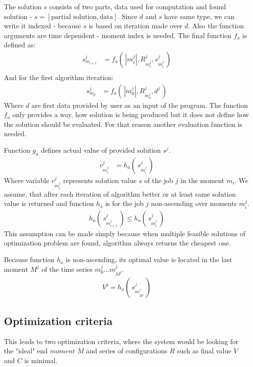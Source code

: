 The solution $s$ consists of two parts, data used for computation and found solution - $s = [\text{partial solution}, \text{data}]$.
Since $d$ and $s$ have same type, we can write it indexed - because $s$ is based on iteration made over $d$.
Also the function arguments are time dependent - moment index is needed.
The final function $f_{a}$ is defined as:
\begin{align*}
	s_{m_{i+1}}^{j} & = f_{a}(\, |m_{i}^{j}|, R_{m_{i}^{j}}^{j}, s_{m_{i}^{j}}^{j}\,) \\
\end{align*}
And for the first algorithm iteration:
\begin{align*}
	s_{m_{0}}^{j} & = f_{a}(\, |m_{0}^{j}|, R_{m_{0}^{j}}^{j}, d^{j}\,) 
\end{align*}
Where $d$ are first data provided by user as an input of the program.
The function $f_{a}$ only provides a way,
how solution is being produced but it does not define how the solution should be evaluated.
For that reason another evaluation function is needed.

\bigskip

\noindent Function $g_{a}$ defines actual value of provided solution $s^{j}$.
\begin{align*}
	v_{m_{i}^{j}}^{j} & = h_{a}(\, s_{m_{i}^{j}}^{j} \,) 
\end{align*}
Where variable $v_{m_{i}^{j}}^{j}$ represents solution value $s$ of the job $j$ in the moment $m_{i}$.
We assume, that after each iteration of algorithm better or at least same solution value is returned
and function $h_{a}$ is for the job $j$ non-ascending over moments $m_{i}^{j}$.
\begin{align*}
	h_{a}(\, s_{m_{i+1}^{j}}^{j} \,) \leq h_{a}(\, s_{m_{i}^{j}}^{j} \,) 
\end{align*}
This assumption can be made simply because when multiple feasible solutions of optimization problem are found,
algorithm always returns the cheapest one.

Because function $h_{a}$ is non-ascending,
its optimal value is located in the last moment $M^j$ of the time series $m_{0}^{j} \dots m_{M^{j}}^{j}$.
\begin{align*}
	V^{j} = h_{a}(\, s_{m_{M^{j}}^{j}}^{j} \,) 
\end{align*}

\subsection{Optimization criteria}\label{subsec:detailed-optimization-criteria}
This leads to two optimization criteria, 
where the system would be looking for the "ideal" end $moment$ $M$ 
and series of configurations $R$ such as final value $V$ and $C$ is minimal.

